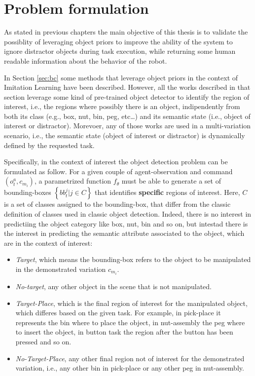 \section{Problem formulation}
\label{sec:cod_problem}
As stated in previous chapters the main objective of this thesis is to validate the possiblity of leveraging object priors to improve the ability of the system to ignore distractor objects during task execution, while returning some human readable information about the behavior of the robot.

In Section \ref{sec:bc} some methods that leverage object priors in the context of Imitation Learning have been described. However, all the works described in that section leverage some kind of pre-trained object detector to identify the region of interest, i.e., the regions where possibly there is an object, indipendently from both its class (e.g., box, nut, bin, peg, etc\dots) and its semantic state (i.e., object of interest or distractor). Morevoer, any of those works are used in a multi-variation scenario, i.e., the semantic state (object of interest or distractor) is dynamically defined by the requested task. 


Specifically, in the context of interest the object detection problem can be formulated as follow. For a given couple of agent-observation and command $\left(o_t^{a}, c_{m_{i}}\right)$, a parametrized function $f_{\theta}$ must be able to generate a set of bounding-boxes $\left\{bb^{j}_{t} | j \in C \right\}$ that identifies \textbf{specific} regions of interest. Here, $C$ is a set of classes assigned to the bounding-box, that differ from the classic definition of classes used in classic object detection. Indeed, there is no interest in predictiing the object category like box, nut, bin and so on, but intestad there is the interest in predicting the semantic attribute associated to the object, which are in the context of interest:
\begin{itemize}
    \item \textit{Target}, which means the bounding-box refers to the object to be manipulated in the demonstrated variation $c_{m_{i}}$.
    \item \textit{No-target}, any other object in the scene that is not manipulated.
    \item \textit{Target-Place}, which is the final region of interest for the manipulated object, which differes based on the given task. For example, in pick-place it represents the bin where to place the object, in nut-assembly the peg where to insert the object, in button task the region after the button has been pressed and so on.
    \item \textit{No-Target-Place}, any other final region not of interest for the demonstrated variation, i.e., any other bin in pick-place or any other peg in nut-assembly.
\end{itemize}


